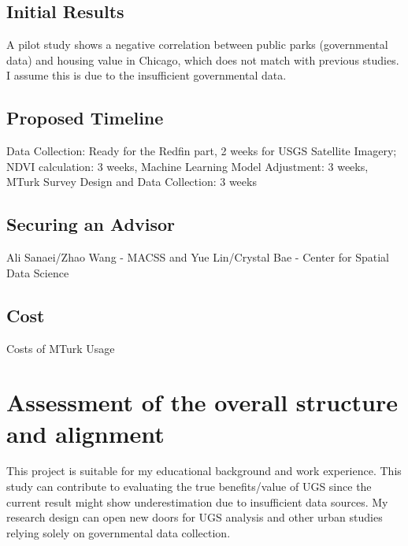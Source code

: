 \documentclass{article}
\begin{document}
\subsection*{Initial Results}
A pilot study shows a negative correlation between public parks (governmental data) and housing value in Chicago, which does not match with previous studies. I assume this is due to the insufficient governmental data.

\subsection*{Proposed Timeline}
Data Collection: Ready for the Redfin part, 2 weeks for USGS Satellite Imagery; NDVI calculation: 3 weeks, Machine Learning Model Adjustment: 3 weeks, MTurk Survey Design and Data Collection: 3 weeks

\subsection*{Securing an Advisor}
Ali Sanaei/Zhao Wang - MACSS and Yue Lin/Crystal Bae - Center for Spatial Data Science

\subsection*{Cost}
Costs of MTurk Usage

\section*{Assessment of the overall structure and alignment}
This project is suitable for my educational background and work experience. This study can contribute to evaluating the true benefits/value of UGS since the current result might show underestimation due to insufficient data sources. My research design can open new doors for UGS analysis and other urban studies relying solely on governmental data collection.
\end{document}
